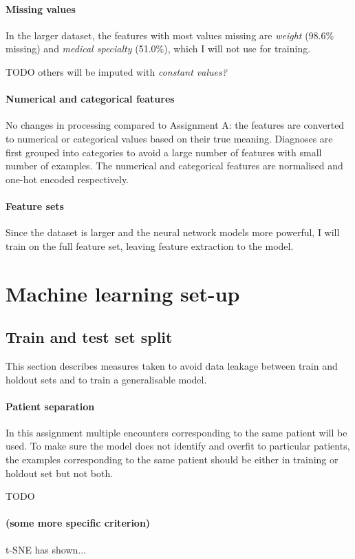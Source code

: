 \documentclass[10pt, twocolumn]{article}
\begin{document}
\paragraph{Missing values} In the larger dataset, the features with most values missing are \textit{weight} (98.6\% missing) and \textit{medical specialty} (51.0\%), which I will not use for training.

TODO others will be imputed with \textit{constant values?}

\paragraph{Numerical and categorical features} No changes in processing compared to Assignment A: the features are converted to numerical or categorical values based on their true meaning. Diagnoses are first grouped into categories to avoid a large number of features with small number of examples. The numerical and categorical features are normalised and one-hot encoded respectively.

\paragraph{Feature sets} Since the dataset is larger and the neural network models more powerful, I will train on the full feature set, leaving feature extraction to the model.

\section{Machine learning set-up}

\subsection{Train and test set split}
This section describes measures taken to avoid data leakage between train and holdout sets and to train a generalisable model.

\paragraph{Patient separation} In this assignment multiple encounters corresponding to the same patient will be used. To make sure the model does not identify and overfit to particular patients, the examples corresponding to the same patient should be either in training or holdout set but not both.

TODO \paragraph{(some more specific criterion)} t-SNE has shown...
\end{document}
